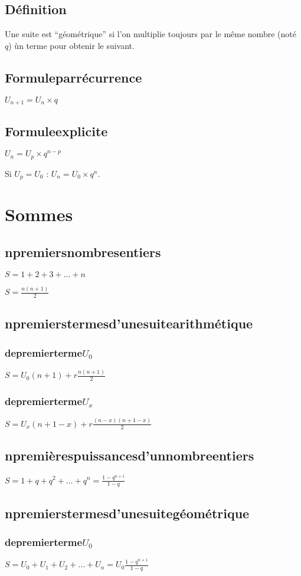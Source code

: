 \documentclass[a4paper,twoside,10pt,french,twocolumn]{scrartcl}
\begin{document}
\subsection{D\'efinition}
Une suite est ``g\'eom\'etrique'' si l'on multiplie toujours par le m\^eme nombre (not\'e $q$) \` un terme pour obtenir le suivant.
\subsection{Formule\:par\:r\'ecurrence}
$U_{n+1} = U_n \times q$
\subsection{Formule\:explicite}
$U_n = U_p \times q^{n-p}$

Si $U_p = U_0$ : $U_n = U_0 \times q^{n}$.
\section{Sommes}
\subsection{n\:premiers\:nombres\:entiers}
$S = 1 + 2 + 3 + \dots + n$

$S = \frac{n(n+1)}{2}$
\subsection{n\:premiers\:termes\:d'une\:suite\:arithm\'etique}
\subsubsection{de\:premier\:terme\:$U_0$}
$ S = U_0(n+1) + r\frac{n(n+1)}{2}$
\subsubsection{de\:premier\:terme\:$U_x$}
$ S = U_x(n+1-x) + r\frac{(n-x)(n+1-x)}{2}$
\subsection{n\:premi\`eres\:puissances\:d'un\:nombre\:entiers}
$S = 1 +q+q^2+\dots+q^n= \frac{1-q^{n+1}}{1-q}$
\subsection{n\:premiers\:termes\:d'une\:suite\:g\'eom\'etrique}
\subsubsection{de\:premier\:terme\:$U_0$}
$S = U_0 + U_1 + U_2 + \dots + U_n= U_0\frac{1-q^{n+1}}{1-q}$
\end{document}
